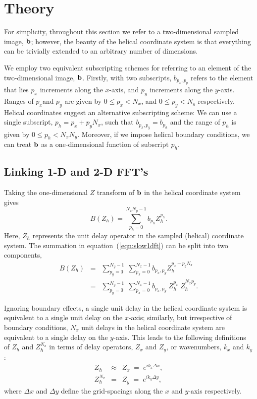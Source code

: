 
\section{Theory}
For simplicity, throughout this section we refer to a two-dimensional 
sampled image, ${\bf b}$; however, the beauty of the helical
coordinate system is that everything can be trivially extended to an
arbitrary number of dimensions.  

\par
We employ two equivalent subscripting schemes for
referring to an element of the two-dimensional image, ${\bf b}$.  
Firstly, with two subscripts, $b_{p_x,p_y}$ refers to the element 
that lies $p_x$ increments along the $x$-axis, and $p_y$
increments along the $y$-axis. 
Ranges of $p_x$and $p_y$ are given by 
$0 \leq p_x < N_x$, and 
$0 \leq p_y < N_y$ respectively. 
Helical coordinates suggest an alternative subscripting scheme:
We can use a single subscript, $p_h=p_x + p_y N_x$, 
such that $b_{p_x,p_y} = b_{p_h}$ and the range of $p_h$ is given by 
$0 \leq p_h < N_x N_y$.
Moreover, if we impose helical boundary conditions, we can
treat ${\bf b}$ as a one-dimensional function of subscript $p_h$.

\subsection{Linking 1-D and 2-D FFT's}
Taking the one-dimensional $Z$ transform of ${\bf b}$ in the helical
coordinate system gives
\begin{equation} \label{eqn:slow1dft}
B(Z_h) = \sum_{p_h=0}^{N_x N_y -1} b_{p_h} Z_h^{p_h}.
\end{equation}
Here, $Z_h$ represents the unit delay operator in the sampled
(helical) coordinate system. 
The summation in equation~(\ref{eqn:slow1dft}) can be split into two
components, 
\begin{eqnarray}
B(Z_h) 
& = & \sum_{p_y=0}^{N_y-1} \; \sum_{p_x=0}^{N_x-1} b_{p_x,p_y} 
Z_h^{p_x+ p_y N_x} \\
& = & \sum_{p_y=0}^{N_y-1} \; \sum_{p_x=0}^{N_x-1} b_{p_x,p_y} 
\; Z_h^{p_x} \; Z_h^{N_x p_y}. \label{eqn:halfway}
\end{eqnarray}

\par
Ignoring boundary effects, a single unit delay in the helical
coordinate system is equivalent to a single unit delay on the
$x$-axis;  
similarly, but irrespective of boundary conditions, $N_x$ unit delays
in the helical coordinate system are equivalent to a single delay on
the $y$-axis.   
This leads to the following definitions of $Z_h$ and
$Z_h^{N_x}$ in terms of delay operators, $Z_x$ and $Z_y$, or
wavenumbers, $k_x$ and $k_y$:
\begin{eqnarray}
Z_h    & \approx &  Z_x \; = \; e^{i k_x \Delta x}, 
\label{eqn:zxdef} \\ 
Z_h^{N_x} & = &  Z_y \; = \; e^{i k_y \Delta y}, \label{eqn:zydef}
\end{eqnarray}
where $\Delta x$ and $\Delta y$ define the grid-spacings along the $x$
and $y$-axis respectively.

